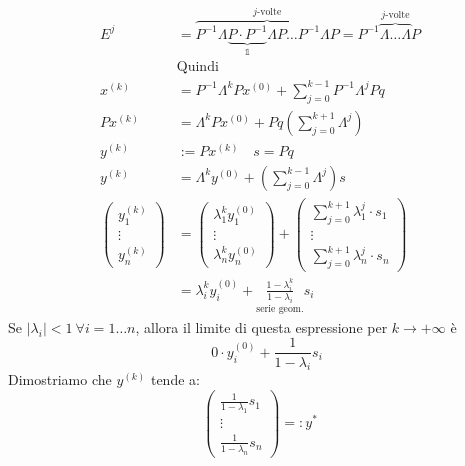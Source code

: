 \documentclass{article}
\begin{document}
\begin{align*}
    E^j             & =\overbrace{P^{-1}\Lambda \underbrace{P\cdot P^{-1}}_{\mathbb 1}\Lambda P\dots P^{-1}\Lambda P}^{j\text{-volte}}=P^{-1}\overbrace{\Lambda\dots\Lambda}^{j\text{-volte}}P \\
                    & \text{Quindi}                                                                                                                                                            \\
    x^{(k)}         & =P^{-1}\Lambda^k Px^{(0)}+\sum_{j=0}^{k-1}P^{-1}\Lambda^j Pq                                                                                                             \\
    Px^{(k)}        & =\Lambda^kPx^{(0)}+Pq\left(\sum_{j=0}^{k+1}\Lambda^j\right)                                                                                                              \\
    y^{(k)}         & :=Px^{(k)}\quad s=Pq                                                                                                                                                     \\
    y^{(k)}         & =\Lambda^ky^{(0)}+\left(\sum_{j=0}^{k-1}\Lambda^j\right)s                                                                                                                \\
    \begin{pmatrix}
        y_1^{(k)} \\
        \vdots    \\
        y_n^{(k)}
    \end{pmatrix} & =
    \begin{pmatrix}
        \lambda_1^{k}y_1^{(0)} \\
        \vdots                 \\
        \lambda_n^{k}y_n^{(0)}
    \end{pmatrix}+\begin{pmatrix}
                      \sum_{j=0}^{k+1}\lambda_1^j\cdot s_1 \\
                      \vdots                               \\
                      \sum_{j=0}^{k+1}\lambda_n^j\cdot s_n
                  \end{pmatrix}                                                                                                                                         \\
                    & =\lambda_i^ky_i^{(0)}+\underset{\text{serie geom.}}{\boxed{\frac{1-\lambda_i^k}{1-\lambda_i}}}s_i
\end{align*}
Se $\left|\lambda_i\right|<1\ \forall i=1\dots n$, allora il limite di questa espressione per $k\to+\infty$ è
\[\quad 0\cdot y_i^{(0)}+\frac{1}{1-\lambda_i}s_i\]
Dimostriamo che $y^{(k)}$ tende a:
\[\begin{pmatrix}
        \frac{1}{1-\lambda_1}s_1 \\
        \vdots                   \\
        \frac{1}{1-\lambda_n}s_n
    \end{pmatrix}=:y^\ast\]
\end{document}

